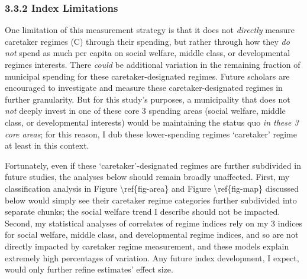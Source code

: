 \documentclass[preprint, 3p,
authoryear]{elsarticle} %
\begin{document}
\hypertarget{index-limitations}{%
\subsubsection{3.3.2 Index Limitations}\label{index-limitations}}

One limitation of this measurement strategy is that it does not
\emph{directly} measure caretaker regimes (C) through their spending,
but rather through how they \emph{do not} spend as much per capita on
social welfare, middle class, or developmental regimes interests. There
\emph{could} be additional variation in the remaining fraction of
municipal spending for these caretaker-designated regimes. Future
scholars are encouraged to investigate and measure these
caretaker-designated regimes in further granularity. But for this
study's purposes, a municipality that does not \emph{not} deeply invest
in one of these core 3 spending areas (social welfare, middle class, or
developmental interests) would be maintaining the status quo \emph{in
these 3 core areas}; for this reason, I dub these lower-spending regimes
`caretaker' regime at least in this context.

Fortunately, even if these `caretaker'-designated regimes are further
subdivided in future studies, the analyses below should remain broadly
unaffected. First, my classification analysis in Figure
\textbackslash ref\{fig-area\} and Figure \textbackslash ref\{fig-map\}
discussed below would simply see their caretaker regime categories
further subdivided into separate chunks; the social welfare trend I
describe should not be impacted. Second, my statistical analyses of
correlates of regime indices rely on my 3 indices for social welfare,
middle class, and developmental regime indices, and so are not directly
impacted by caretaker regime measurement, and these models explain
extremely high percentages of variation. Any future index development, I
expect, would only further refine estimates' effect size.
\end{document}
